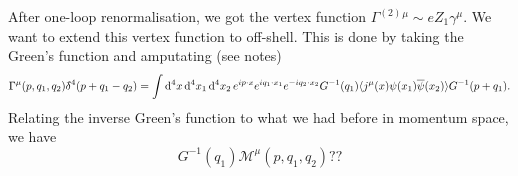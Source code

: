 After one-loop renormalisation, we got the vertex function $ \Gamma^{(2)}{}^{\mu} \sim e Z_1 \gamma^{\mu}.$
We want to extend this vertex function to off-shell.
This is done by taking the Green's function and amputating (see notes)
\begin{equation}
  \Gamma^{\mu}(p, q_1, q_2) \delta\hspace*{-0.2em}\bar{}\hspace*{0.2em}^4(p + q_1 - q_2) = \int \dd[4]{x} \dd[4]{x_1} \dd[4]{x_2} e^{i p \cdot x} e^{i q_1 \cdot x_1} e^{-i q_2 \cdot x_2} G^{-1} (q_1) \langle j^{\mu}(x) \psi(x_1) \overline{\psi}{}(x_2) \rangle G^{-1} (p + q_1).
\end{equation}
Relating the inverse Green's function to what we had before in momentum space, we have
\begin{equation}
  G^{-1}(q_1) \mathcal{M}^{\mu}(p, q_1, q_2) ??
\end{equation}
